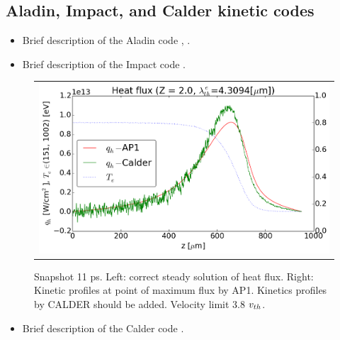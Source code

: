 \subsection{Aladin, Impact, and Calder kinetic codes}
\label{sec:AladinImpactCaldercodes}

\begin{itemize}
  \item Brief description of the Aladin code , . %
\end{itemize}

\begin{itemize}
  \item Brief description of the Impact code .
\end{itemize}

\begin{figure}[tbh]
  \begin{center}
    \begin{tabular}{c}
      \includegraphics[width=\figscale\textwidth]{../VFPdata/C7_Calder_case1_heatflux.png} 
    \end{tabular}
  \caption{  
  Snapshot 11 ps. Left: correct steady solution of heat flux. 
  Right: Kinetic profiles at point of maximum flux by AP1. 
  Kinetics profiles by CALDER should be added. Velocity limit 3.8 $v_{th}$.
  }
  \label{fig:C7_Calder_case1}
  \end{center} 
\end{figure}

\begin{itemize}
  \item Brief description of the Calder code .
\end{itemize}

